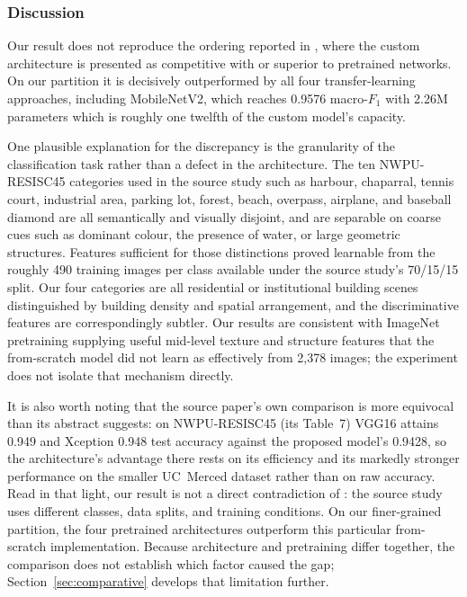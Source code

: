 \documentclass[11pt,twoside,a4paper]{article}
\begin{document}
\subsubsection{Discussion}

Our result does not reproduce the ordering reported in \cite{Abdelmonem2026},
where the custom architecture is presented as competitive with or superior to
pretrained networks. On our partition it is decisively outperformed by all four
transfer-learning approaches, including MobileNetV2, which reaches 0.9576
macro-$F_1$ with 2.26M parameters which is roughly one twelfth of the custom model's
capacity.

One plausible explanation for the discrepancy is the granularity of the
classification task rather than a defect in the architecture. The ten
NWPU-RESISC45 categories
used in the source study such as harbour, chaparral, tennis court, industrial area,
parking lot, forest, beach, overpass, airplane, and baseball diamond are all semantically and visually disjoint, and are separable on coarse cues such as
dominant colour, the presence of water, or large geometric structures. Features
sufficient for those distinctions proved learnable from the roughly 490
training images per class available under the source study's 70/15/15 split. Our
four categories are all residential or institutional building scenes
distinguished by building density and spatial arrangement, and the
discriminative features are correspondingly subtler. Our results are consistent
with ImageNet pretraining supplying useful mid-level texture and structure
features that the from-scratch model did not learn as effectively from 2,378
images; the experiment does not isolate that mechanism directly.

It is also worth noting that the source paper's own comparison is more equivocal
than its abstract suggests: on NWPU-RESISC45 (its Table~7) VGG16 attains 0.949
and Xception 0.948 test accuracy against the proposed model's 0.9428, so the
architecture's advantage there rests on its efficiency and its markedly stronger
performance on the smaller UC~Merced dataset rather than on raw accuracy. Read
in that light, our result is not a direct contradiction of
\cite{Abdelmonem2026}: the source study uses different classes, data splits, and
training conditions. On our finer-grained partition, the four pretrained
architectures outperform this particular from-scratch implementation. Because
architecture and pretraining differ together, the comparison does not establish
which factor caused the gap; Section~\ref{sec:comparative} develops that
limitation further.
\end{document}
